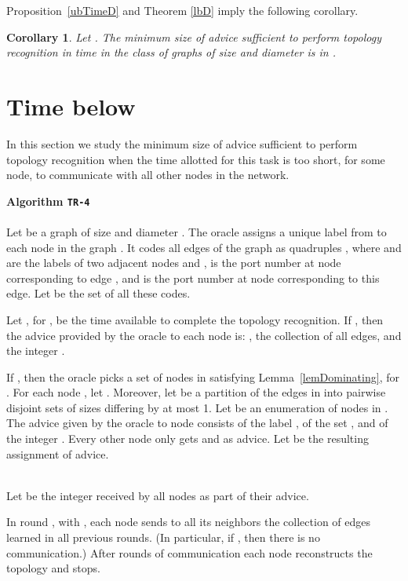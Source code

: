 \documentclass{article}
\newtheorem{corollary}{Corollary}[section]
\newcommand{\algo}[1]{
\medskip
\noindent \textbf{Algorithm {\tt #1}}\\
\nopagebreak}
\newcommand{\procend}{\hfill \medskip}
\begin{document}
Proposition~\ref{ubTimeD} and Theorem \ref{lbD} imply the following corollary.
\begin{corollary}\label{corD}
Let .
The minimum size of advice sufficient to perform topology recognition in time  in the class of graphs of size  and diameter 
is in .
\end{corollary}


\section{Time below }
In this section we study the minimum size of advice sufficient to perform topology recognition when the time allotted for this task is too short, for some node, to communicate with all other nodes in the network.



\algo{TR-4}
\\
Let  be a graph of size  and diameter .
The oracle assigns a unique label  from  to each node  in the graph .
It codes all edges of the graph as quadruples , where  and  are the labels of two adjacent nodes  and ,  is the port number at node  corresponding to edge , and  is the port number at node  corresponding to this edge.
Let  be the set of all these codes.

Let {, for , be the time available to complete the topology recognition}.
If , then the advice provided by  the oracle to each node  is: , the collection  of all edges, and the integer .


If , then the oracle picks a set  of nodes in   satisfying Lemma~\ref{lemDominating}, for .
{For each node , l}et . Moreover, let  be a partition of the edges in  into  pairwise disjoint sets of sizes differing by at most 1. 
Let  be an enumeration of nodes in .
The advice given by the oracle to node  consists of the label , of the set , and of the integer .
Every other node  only gets  and  as advice.
Let  be the resulting assignment of advice.

\\
Let  be the integer received by all nodes as part of their advice.

In round , with , each node sends to all its neighbors the collection of edges learned in all previous rounds. 
(In particular, if , then there is no communication.)
After  rounds of communication each node reconstructs the topology and stops.
\procend
\end{document}
